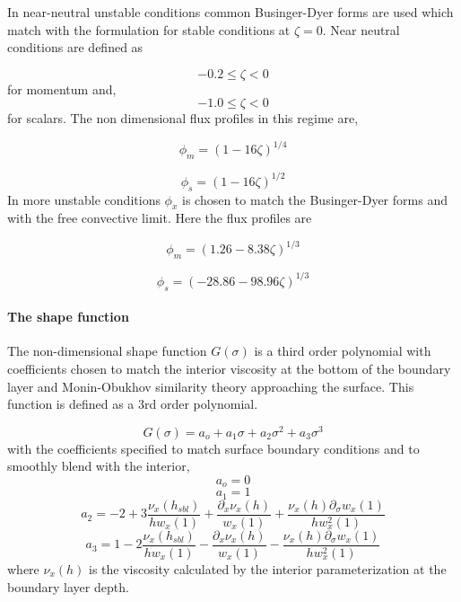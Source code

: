 In near-neutral unstable conditions common Businger-Dyer forms are
used which match with the formulation for stable conditions at
$\zeta=0$.  Near neutral conditions are defined as 

\begin{equation}
-0.2 \leq \zeta < 0
\end{equation}
for momentum and,
\begin{equation}
-1.0 \leq \zeta < 0
\end{equation}
for scalars.  The non dimensional flux profiles in this regime are,

\begin{equation}
\phi_m=(1-16\zeta)^{1/4}
\end{equation}

\begin{equation}
\phi_s=(1-16\zeta)^{1/2}
\end{equation}
In more unstable conditions $\phi_x$ is chosen to match the
Businger-Dyer forms and with the free convective limit.  Here the flux 
profiles are 

\begin{equation}
\phi_m=(1.26-8.38\zeta)^{1/3}
\end{equation}

\begin{equation}
\phi_s=(-28.86-98.96\zeta)^{1/3}
\end{equation}

\paragraph{The shape function}
The non-dimensional shape function $G(\sigma)$ is a third order
polynomial with coefficients chosen to match the interior viscosity at
the bottom of the boundary layer and Monin-Obukhov
similarity theory approaching the surface.  This function is defined
as a 3rd order polynomial.

\begin{equation}
G(\sigma)=a_o+a_1\sigma+a_2\sigma^2+a_3\sigma^3
\end{equation}
with the coefficients specified to match surface boundary conditions
and to smoothly blend with the interior,
\begin{equation}
a_o=0
\end{equation}
\begin{equation}
a_1=1
\end{equation}
\begin{equation}
a_2=-2+3\frac{\nu_{x}(h_{sbl})}{hw_x(1)}+\frac{\partial_x \nu_{x}(h)}{w_{x}(1)}+\frac{\nu_{x}(h)\partial_{\sigma}w_x(1)}{hw_{x}^{2}(1)}
\end{equation}
\begin{equation}
a_3=1-2\frac{\nu_{x}(h_{sbl})}{hw_x(1)}-\frac{\partial_x \nu_{x}(h)}{w_{x}(1)}-\frac{\nu_{x}(h)\partial_{\sigma}w_x(1)}{hw_{x}^{2}(1)}
\end{equation}
where $\nu_{x}(h)$ is the viscosity calculated by the interior
parameterization at the boundary layer depth.

